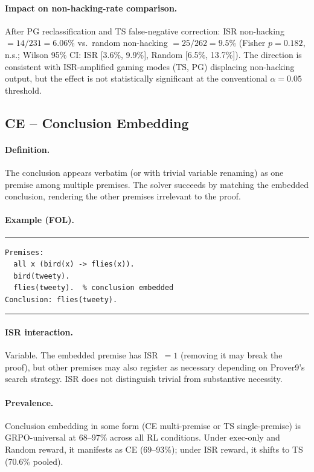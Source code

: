 \paragraph{Impact on non-hacking-rate comparison.}
After PG reclassification and TS false-negative correction: ISR non-hacking $= 14/231 = 6.06\%$ vs.\ random non-hacking $= 25/262 = 9.5\%$ (Fisher $p{=}0.182$, n.s.; Wilson 95\% CI: ISR [3.6\%, 9.9\%], Random [6.5\%, 13.7\%]).
The direction is consistent with ISR-amplified gaming modes (TS, PG) displacing non-hacking output, but the effect is not statistically significant at the conventional $\alpha{=}0.05$ threshold.

\subsection{CE -- Conclusion Embedding}

\paragraph{Definition.}
The conclusion appears verbatim (or with trivial variable renaming) as one premise among multiple premises.
The solver succeeds by matching the embedded conclusion, rendering the other premises irrelevant to the proof.

\paragraph{Example (FOL).}
\smallskip\noindent\rule{\columnwidth}{0.3pt}
{\small\begin{verbatim}
Premises:
  all x (bird(x) -> flies(x)).
  bird(tweety).
  flies(tweety).  % conclusion embedded
Conclusion: flies(tweety).
\end{verbatim}}
\noindent\rule{\columnwidth}{0.3pt}\smallskip

\paragraph{ISR interaction.}
Variable. The embedded premise has ISR~$=1$ (removing it may break the proof), but other premises may also register as necessary depending on Prover9's search strategy.
ISR does not distinguish trivial from substantive necessity.

\paragraph{Prevalence.}
Conclusion embedding in some form (CE multi-premise or TS single-premise) is GRPO-universal at 68--97\% across all RL conditions.
Under exec-only and Random reward, it manifests as CE (69--93\%); under ISR reward, it shifts to TS (70.6\% pooled).



